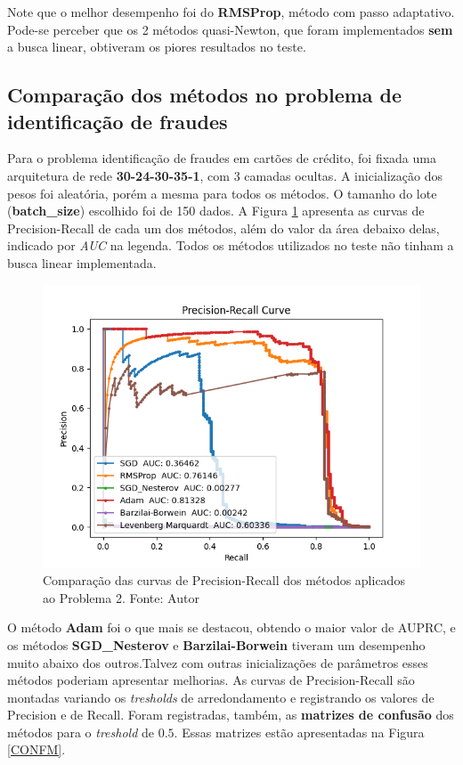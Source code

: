 \documentclass[11pt]{article}
\begin{document}
\noindent
Note que o melhor desempenho foi do \textbf{RMSProp}, método com passo adaptativo. Pode-se perceber que os 2 métodos quasi-Newton, que foram implementados \textbf{sem} a busca linear, obtiveram os piores resultados no teste.


\subsection*{Comparação dos métodos no problema de identificação de fraudes}
Para o problema identificação de fraudes em cartões de crédito, foi fixada uma arquitetura de rede \textbf{30-24-30-35-1}, com 3 camadas ocultas. A inicialização dos pesos foi aleatória, porém a mesma para todos os métodos. O tamanho do lote (\textbf{batch\_size}) escolhido foi de 150 dados.
A Figura \ref{FRAUD} apresenta as curvas de Precision-Recall \cite{PRC} de cada um dos métodos, além do valor da área debaixo delas, indicado por \textit{AUC} na legenda. Todos os métodos utilizados no teste não tinham a busca linear implementada.

\begin{figure}[H]
\center
\includegraphics[scale=0.8]{Figuras/FRAUD.png}
\caption{Comparação das curvas de Precision-Recall dos métodos aplicados ao Problema 2. Fonte: Autor} 
\label{FRAUD}
\end{figure}


\noindent
O método \textbf{Adam} foi o que mais se destacou, obtendo o maior valor de AUPRC, e os métodos \textbf{SGD\_Nesterov} e \textbf{Barzilai-Borwein} tiveram um desempenho muito abaixo dos outros.Talvez com outras inicializações de parâmetros esses métodos poderiam apresentar melhorias.
As curvas de Precision-Recall são montadas variando os \textit{tresholds} de arredondamento e registrando os valores de Precision e de Recall. Foram registradas, também, as \textbf{matrizes de confusão} dos métodos para o \textit{treshold} de $0.5$. Essas matrizes estão apresentadas na Figura \ref{CONFM}.
\end{document}
